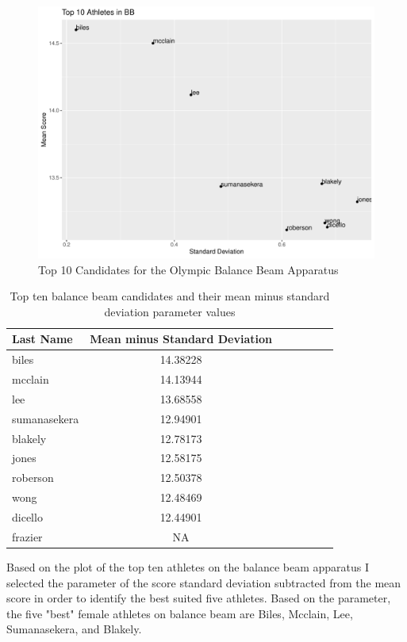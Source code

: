 \documentclass[12pt]{article}
\begin{document}
\begin{figure}[tbp]
  \centering
  \includegraphics[scale=0.6]{Top10AthletesBB.pdf}
  \caption{Top 10 Candidates for the Olympic Balance Beam Apparatus}
  \label{fig:BB}
\end{figure}

\begin{table}[tbp]
  \caption{Top ten balance beam candidates and their mean minus standard deviation parameter values}
  \label{tab:tableBBP}
\centering
\begin{tabular}[t]{lccllll}
 \toprule
Last Name & Mean minus Standard Deviation\\
\midrule
biles & 14.38228\\
\midrule
mcclain & 14.13944\\
\midrule
lee & 13.68558\\
\midrule
sumanasekera & 12.94901\\
\midrule
blakely & 12.78173\\
\midrule
jones & 12.58175\\
\midrule
roberson & 12.50378\\
\midrule
wong & 12.48469\\
\midrule
dicello & 12.44901\\
\midrule
frazier & NA\\
\bottomrule
\end{tabular}
\end{table}

Based on the plot of the top ten athletes on the balance beam apparatus I selected the parameter of 
the score standard deviation subtracted from the mean score in order to identify the best suited five 
athletes. Based on the parameter, the five "best" female athletes on balance beam are Biles, Mcclain, 
Lee, Sumanasekera, and Blakely.
\end{document}
